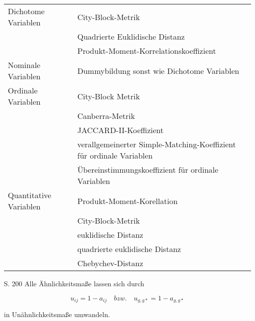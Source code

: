 \begin{tabular}{|l|l|}
	 \hline
	 Dichotome Variablen & City-Block-Metrik \\
	 & Quadrierte Euklidische Distanz \\
	 & Produkt-Moment-Korrelationskoeffizient \\ \hline
	 Nominale Variablen & Dummybildung sonst wie Dichotome Variablen \\ \hline
	 Ordinale Variablen & City-Block Metrik \\ 
	 & Canberra-Metrik \\
	 & JACCARD-II-Koeffizient \\
	 & verallgemeinerter Simple-Matching-Koeffizient für ordinale Variablen \\
	 & Übereinstimmungskoeffizient für ordinale Variablen \\ \hline
	 Quantitative Variablen & Produkt-Moment-Korellation \\
	 & City-Block-Metrik \\
	 & euklidische Distanz \\
	 & quadrierte euklidische Distanz \\
	 & Chebychev-Distanz \\ \hline
\end{tabular}


\cite{Bacher.2010} S. 200 Alle Ähnlichkeitsmaße lassen sich durch 

\begin{equation}
u_{ij} = 1 - a_{ij} \quad bzw.\quad u_{g,g*} = 1- a_{g,g*}
\end{equation}

in Unähnlichkeitsmaße umwandeln.